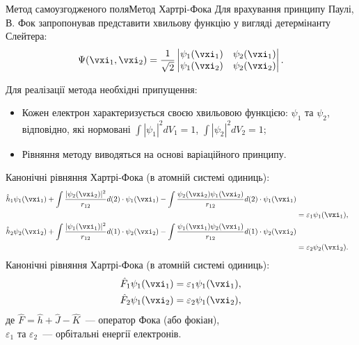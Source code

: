 \documentclass[10pt]{beamer}
\begin{document}
\begin{frame}{Метод самоузгодженого поля}{Метод Хартрі-Фока}
	Для врахування принципу Паулі, В. Фок запропонував представити хвильову функцію у вигляді детермінанту Слейтера:
	\begin{equation*}
		\Psi (\vxi_1, \vxi_2)={\frac {1}{\sqrt {2}}}
		\left|
		{
		\begin{matrix}
			\psi_{1}(\vxi_1) & \psi_{2}(\vxi_1) \\
			\psi_{1}(\vxi_2) & \psi_{2}(\vxi_2)
		\end{matrix}
		}
		\right|.
	\end{equation*}

	\begin{overprint}
		Для реалізації метода необхідні припущення:
		\begin{itemize}
			\item Кожен електрон характеризується своєю хвильовою функцією: $\psi_1$ та $\psi_2$, відповідно, які нормовані $\int |\psi_1|^2 dV_1 = 1$,  $\int |\psi_2|^2 dV_2 = 1$;
			\item Рівняння методу виводяться на основі варіаційного принципу.
		\end{itemize}
		Канонічні рівняння Хартрі-Фока (в атомній системі одиниць):
		{\footnotesize
		\begin{align*}
			\hat{h}_1\psi_1(\vxi_1) +
			\int\frac{|\psi_2(\vxi_2)|^2}{r_{12}} d(2) \cdot \psi_1 (\vxi_1) -
			\int \frac{\psi_2(\vxi_2)\psi_1(\vxi_2)}{r_{12}}d(2)\cdot\psi_1(\vxi_1) \\
			 & = \varepsilon_1 \psi_1(\vxi_1),                                        \\
			\hat{h}_2\psi_2(\vxi_2) +
			\int\frac{|\psi_1(\vxi_1)|^2}{r_{12}} d(1) \cdot \psi_2 (\vxi_2) -
			\int \frac{\psi_1(\vxi_1)\psi_2(\vxi_1)}{r_{12}}d(1)\cdot\psi_2(\vxi_2) \\
			 & = \varepsilon_2 \psi_2(\vxi_2).
		\end{align*}}
		\onslide<3>
		Канонічні рівняння Хартрі-Фока (в атомній системі одиниць):
		\begin{align*}
			\hat{F}_1\psi_1(\vxi_1) & = \varepsilon_1 \psi_1(\vxi_1), \\
			\hat{F}_2\psi_1(\vxi_2) & = \varepsilon_2 \psi_1(\vxi_2),
		\end{align*}
		\noindent де $\hat{F} = \hat{h} + \hat{J} - \hat{K}$~--- оператор Фока (або фокіан),\\
		\noindent $\varepsilon_1$ та $\varepsilon_2$~--- орбітальні енергії електронів.


\end{overprint}
\end{frame}
\end{document}

